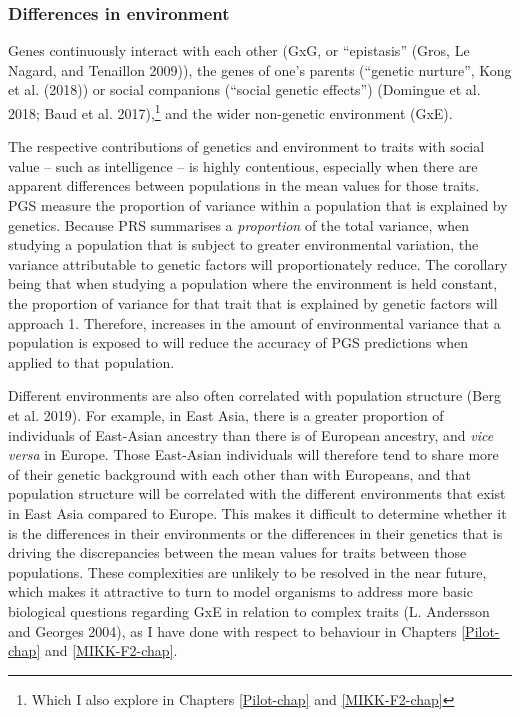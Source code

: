 \documentclass[
]{book}
\begin{document}
\hypertarget{fst-env-sec}{%
\subsubsection{Differences in environment}\label{fst-env-sec}}

Genes continuously interact with each other (GxG, or ``epistasis'' (Gros, Le Nagard, and Tenaillon 2009)), the genes of one's parents (``genetic nurture'', Kong et al. (2018)) or social companions (``social genetic effects'') (Domingue et al. 2018; Baud et al. 2017),\footnote{Which I also explore in Chapters \ref{Pilot-chap} and \ref{MIKK-F2-chap}} and the wider non-genetic environment (GxE).

The respective contributions of genetics and environment to traits with social value -- such as intelligence -- is highly contentious, especially when there are apparent differences between populations in the mean values for those traits. PGS measure the proportion of variance within a population that is explained by genetics. Because PRS summarises a \emph{proportion} of the total variance, when studying a population that is subject to greater environmental variation, the variance attributable to genetic factors will proportionately reduce. The corollary being that when studying a population where the environment is held constant, the proportion of variance for that trait that is explained by genetic factors will approach 1. Therefore, increases in the amount of environmental variance that a population is exposed to will reduce the accuracy of PGS predictions when applied to that population.

Different environments are also often correlated with population structure (Berg et al. 2019). For example, in East Asia, there is a greater proportion of individuals of East-Asian ancestry than there is of European ancestry, and \emph{vice versa} in Europe. Those East-Asian individuals will therefore tend to share more of their genetic background with each other than with Europeans, and that population structure will be correlated with the different environments that exist in East Asia compared to Europe. This makes it difficult to determine whether it is the differences in their environments or the differences in their genetics that is driving the discrepancies between the mean values for traits between those populations. These complexities are unlikely to be resolved in the near future, which makes it attractive to turn to model organisms to address more basic biological questions regarding GxE in relation to complex traits (L. Andersson and Georges 2004), as I have done with respect to behaviour in Chapters \ref{Pilot-chap} and \ref{MIKK-F2-chap}.
\end{document}
